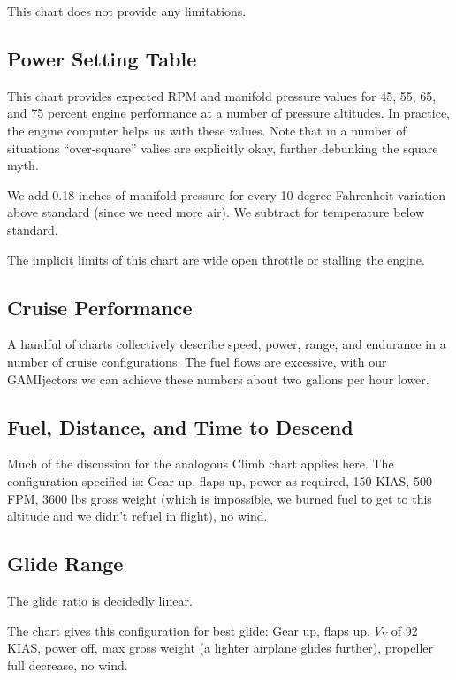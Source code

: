 This chart does not provide any limitations.

\subsection{Power Setting Table}

This chart provides expected RPM and manifold pressure values for 45, 55, 65, and 75 percent engine performance at a number of pressure altitudes. In practice, the engine computer helps us with these values. Note that in a number of situations ``over-square'' valies are explicitly okay, further debunking the square myth.

We add 0.18 inches of manifold pressure for every 10 degree Fahrenheit variation above standard (since we need more air). We subtract for temperature below standard.

The implicit limits of this chart are wide open throttle or stalling the engine.

\subsection{Cruise Performance}

A handful of charts collectively describe speed, power, range, and endurance in a number of cruise configurations. The fuel flows are excessive, with our GAMIjectors we can achieve these numbers about two gallons per hour lower.

\subsection{Fuel, Distance, and Time to Descend}

Much of the discussion for the analogous Climb chart applies here. The configuration specified is: Gear up, flaps up, power as required, 150 KIAS, 500 FPM, 3600 lbs gross weight (which is impossible, we burned fuel to get to this altitude and we didn't refuel in flight), no wind.

\subsection{Glide Range}

The glide ratio is decidedly linear.

The chart gives this configuration for best glide: Gear up, flaps up, $V_Y$ of 92 KIAS, power off, max gross weight (a lighter airplane glides further), propeller full decrease, no wind.

